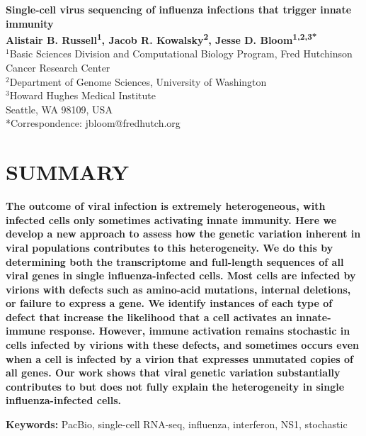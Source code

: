\documentclass[10pt,letterpaper]{article}
\providecommand{\keywords}[1]{\noindent \textbf{Keywords:} #1}
\begin{document}
\vspace*{0.2in}

\begin{flushleft}
{\LARGE
\textbf{Single-cell virus sequencing of influenza infections that trigger innate immunity}}
\newline
\\
{\bf
Alistair B. Russell\textsuperscript{1},
Jacob R. Kowalsky\textsuperscript{2},
Jesse D. Bloom\textsuperscript{1,2,3*}
}
\\
\bigskip
{\small
$^1$Basic Sciences Division and Computational Biology Program, Fred Hutchinson Cancer Research Center
\\
$^2$Department of Genome Sciences, University of Washington
\\
$^3$Howard Hughes Medical Institute
\\
Seattle, WA  98109, USA
\\
*Correspondence: jbloom@fredhutch.org
}
\bigskip


\end{flushleft}

\section*{SUMMARY}
{\bf
The outcome of viral infection is extremely heterogeneous, with infected cells only sometimes activating innate immunity.  
Here we develop a new approach to assess how the genetic variation inherent in viral populations contributes to this heterogeneity.
We do this by determining both the transcriptome and full-length sequences of all viral genes in single influenza-infected cells.
Most cells are infected by virions with defects such as amino-acid mutations, internal deletions, or failure to express a gene.
We identify instances of each type of defect that increase the likelihood that a cell activates an innate-immune response.
However, immune activation remains stochastic in cells infected by virions with these defects, and sometimes occurs even when a cell is infected by a virion that expresses unmutated copies of all genes.
Our work shows that viral genetic variation substantially contributes to but does not fully explain the heterogeneity in single influenza-infected cells.
}

\vspace{0.2in}
\keywords{PacBio, single-cell RNA-seq, influenza, interferon, NS1, stochastic}
\end{document}
